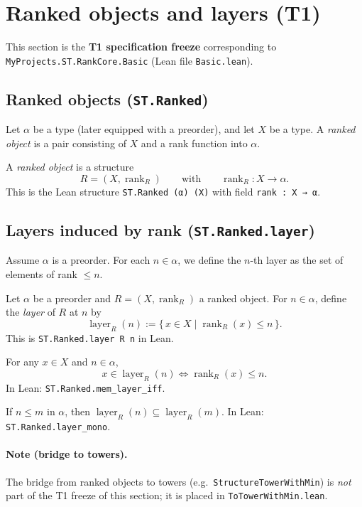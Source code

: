 \section{Ranked objects and layers (T1)}
\label{sec:rankcore}

This section is the \textbf{T1 specification freeze} corresponding to
\texttt{MyProjects.ST.RankCore.Basic} (Lean file \texttt{Basic.lean}).

\subsection{Ranked objects (\texttt{ST.Ranked})}

Let $\alpha$ be a type (later equipped with a preorder), and let $X$ be a type.
A \emph{ranked object} is a pair consisting of $X$ and a rank function into $\alpha$.

\begin{definition}\label{def:ranked}
A \emph{ranked object} is a structure
\[
  R = (X, \operatorname{rank}_R) \qquad\text{with}\qquad \operatorname{rank}_R : X \to \alpha.
\]
This is the Lean structure \texttt{ST.Ranked (α) (X)} with field \texttt{rank : X → α}.
\end{definition}

\subsection{Layers induced by rank (\texttt{ST.Ranked.layer})}

Assume $\alpha$ is a preorder. For each $n \in \alpha$, we define the $n$-th layer as the set of
elements of rank $\le n$.

\begin{definition}[Layer]\label{def:layer}
Let $\alpha$ be a preorder and $R=(X,\operatorname{rank}_R)$ a ranked object.
For $n\in \alpha$, define the \emph{layer} of $R$ at $n$ by
\[
  \operatorname{layer}_R(n) := \{\,x \in X \mid \operatorname{rank}_R(x) \le n\,\}.
\]
This is \texttt{ST.Ranked.layer R n} in Lean.
\end{definition}

\begin{lemma}\label{lem:mem-layer-iff}
For any $x\in X$ and $n\in \alpha$,
\[
  x \in \operatorname{layer}_R(n) \iff \operatorname{rank}_R(x) \le n.
\]
In Lean: \texttt{ST.Ranked.mem\_layer\_iff}.
\end{lemma}

\begin{lemma}\label{lem:layer-mono}
If $n \le m$ in $\alpha$, then $\operatorname{layer}_R(n) \subseteq \operatorname{layer}_R(m)$.
In Lean: \texttt{ST.Ranked.layer\_mono}.
\end{lemma}

\paragraph{Note (bridge to towers).}
The bridge from ranked objects to towers (e.g.\ \texttt{StructureTowerWithMin})
is \emph{not} part of the T1 freeze of this section; it is placed in
\texttt{ToTowerWithMin.lean}.
